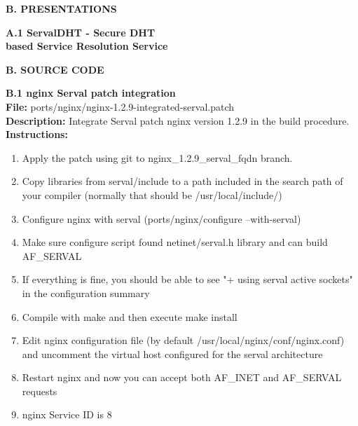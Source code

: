\newpage
{}
{}
\label{sec:sourcecode}
{\Huge \bf \noindent B. PRESENTATIONS}

\newpage
{}
{}
\label{sec:servaldhtpres}
{\huge \bf \noindent A.1 ServalDHT - Secure DHT\\[0.2cm] based Service Resolution Service}



\newpage
{}
{}
\label{sec:sourcecode}
{\Huge \bf \noindent B. SOURCE CODE}


\newpage
{}
{}
\label{sec:nginxport}
{\huge \bf \noindent B.1 nginx Serval patch integration}\\[0.5cm]
\textbf{File:} ports/nginx/nginx-1.2.9-integrated-serval.patch\\
\textbf{Description:} Integrate Serval patch nginx version 1.2.9 in the build procedure.\\
\textbf{Instructions: }
\begin{enumerate} \itemsep1pt \parskip0pt 
	\item Apply the patch using git to nginx\_1.2.9\_serval\_fqdn branch.
	\item Copy libraries from serval/include to a path included in the search path of your compiler (normally that should be /usr/local/include/)
	\item Configure nginx with serval (ports/nginx/configure --with-serval)
	\item Make sure configure script found netinet/serval.h library and can build AF\_SERVAL
	\item If everything is fine, you should be able to see "+ using serval active sockets" in the configuration summary
	\item Compile with make and then execute make install
	\item Edit nginx configuration file (by default /usr/local/nginx/conf/nginx.conf) and uncomment the virtual host configured for the serval architecture
	\item Restart nginx and now you can accept both AF\_INET and AF\_SERVAL requests
	\item nginx Service ID is 8\\[0.5cm]
\end{enumerate}


